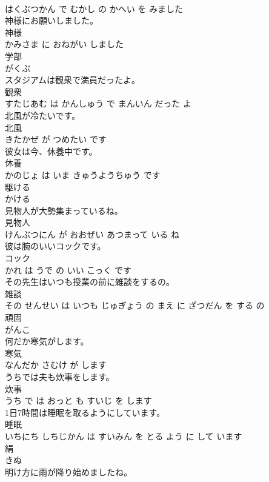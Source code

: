 \documentclass[8pt]{extreport}
\begin{document}
\begin{CJK}{UTF8}{min}
\\	はくぶつかん で むかし の かへい を みました			
\\	神様にお願いしました。	
\\	神様 
\\	かみさま に おねがい しました			
\\	学部	
\\	がくぶ		
\\	スタジアムは観衆で満員だったよ。	
\\	観衆 
\\	すたじあむ は かんしゅう で まんいん だった よ			
\\	北風が冷たいです。	
\\	北風 
\\	きたかぜ が つめたい です			
\\	彼女は今、休養中です。	
\\	休養 
\\	かのじょ は いま きゅうようちゅう です			
\\	駆ける	
\\	かける		
\\	見物人が大勢集まっているね。	
\\	見物人 
\\	けんぶつにん が おおぜい あつまって いる ね			
\\	彼は腕のいいコックです。	
\\	コック 
\\	かれ は うで の いい こっく です			
\\	その先生はいつも授業の前に雑談をするの。	
\\	雑談 
\\	その せんせい は いつも じゅぎょう の まえ に ざつだん を する の			
\\	頑固	
\\	がんこ		
\\	何だか寒気がします。	
\\	寒気 
\\	なんだか さむけ が します			
\\	うちでは夫も炊事をします。	
\\	炊事 
\\	うち で は おっと も すいじ を します			
\\	1日7時間は睡眠を取るようにしています。	
\\	睡眠 
\\	いちにち しちじかん は すいみん を とる よう に して います			
\\	絹	
\\	きぬ		
\\	明け方に雨が降り始めましたね。	

\end{CJK}
\end{document}
